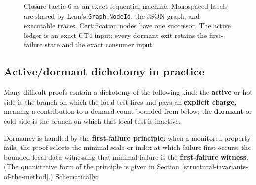 \documentclass[
  11pt,
]{article}
\theoremstyle{definition}
\newcommand{\secref}[1]{\hyperref[#1]{Section~\ref*{#1}}}
\begin{document}
\begin{figure}[p]
{%
}
\caption[Closure-tactic 6: exact active/dormant machine]{Closure-tactic 6 as an exact sequential machine.  Monospaced labels are shared by Lean's \texttt{Graph.NodeId}, the JSON graph, and executable traces.  Certification nodes have one successor.  The active ledger is an exact CT4 input; every dormant exit retains the first-failure state and the exact consumer input.}
\label{fig:ct6-active-dormant}
\end{figure}
\FloatBarrier


\subsection*{Active/dormant dichotomy in practice}

Many difficult proofs contain a dichotomy of the following kind:
the \textbf{active} or hot side is the branch on which the local test
fires and pays an \textbf{explicit charge}, meaning a contribution to a
demand count bounded from below; the \textbf{dormant} or cold side is
the branch on which that local test is inactive.

Dormancy is handled by the \textbf{first-failure principle}: when a
monitored property fails, the proof selects the minimal scale or index
at which failure first occurs; the bounded local data witnessing that
minimal failure is the \textbf{first-failure witness}. (The quantitative
form of the principle is given in \secref{structural-invariants-of-the-method}.) Schematically:
\end{document}
